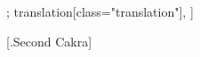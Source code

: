  \begin{alignment}[
    texts=edition[class="edition"];
    translation[class="translation"],
  ]
\begin{edition}
 \centerline{\textrm{\small{[.\textsuperscript{}Second Cakra]}}}
 \label{cakra2}
    \bigskip
    \begin{prose}

\end{prose}
\end{edition}
\end{alignment}
